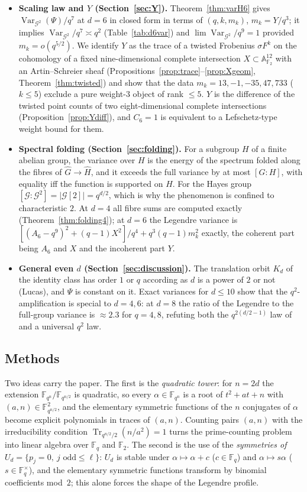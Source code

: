 \documentclass[11pt,a4paper]{amsart}
\theoremstyle{definition}
\newcommand{\F}{\mathbb{F}}
\newcommand{\A}{\mathbb{A}}
\newcommand{\G}{\mathcal{G}}
\newcommand{\Tr}{\operatorname{Tr}}
\newcommand{\Var}{\operatorname{Var}}
\begin{document}
\begin{itemize}[leftmargin=2em]
\item \textbf{Scaling law and $Y$ (Section~\ref{sec:Y}).} Theorem~\ref{thm:varH6} gives $\Var_{\G^2}(\Psi)/q^7$ at $d=6$ in closed form in terms of $(q,k,m_k)$, $m_k=Y/q^3$; it implies $\Var_{\G^2}/q^7\asymp q^2$ (Table~\ref{tab:d6var}) and $\lim\Var_{\G^2}/q^9=1$ provided $m_k=o(q^{5/2})$. We identify $Y$ as the trace of a twisted Frobenius $\sigma F^k$ on the cohomology of a fixed nine-dimensional complete intersection $X\subset\A^{12}_{\F_2}$ with an Artin--Schreier sheaf (Propositions~\ref{prop:trace}--\ref{prop:Xgeom}, Theorem~\ref{thm:twisted}) and show that the data $m_k=13,-1,-35,47,733$ ($k\le5$) exclude a pure weight-$3$ object of rank $\le5$. $Y$ is the difference of the twisted point counts of two eight-dimensional complete intersections (Proposition~\ref{prop:Ydiff}), and $C_6=1$ is equivalent to a Lefschetz-type weight bound for them.
\item \textbf{Spectral folding (Section~\ref{sec:folding}).} For a subgroup $H$ of a finite abelian group, the variance over $H$ is the energy of the spectrum folded along the fibres of $\widehat G\to\widehat H$, and it exceeds the full variance by at most $[G:H]$, with equality iff the function is supported on $H$. For the Hayes group $[\G:\G^2]=|\G[2]|=q^{d/2}$, which is why the phenomenon is confined to characteristic $2$. At $d=4$ all fibre sums are computed exactly (Theorem~\ref{thm:folding4}); at $d=6$ the Legendre variance is $[(A_6-q^9)^2+(q-1)X^2]/q^4+q^3(q-1)m_k^2$ exactly, the coherent part being $A_6$ and $X$ and the incoherent part $Y$.
\item \textbf{General even $d$ (Section~\ref{sec:discussion}).} The translation orbit $K_d$ of the identity class has order $1$ or $q$ according as $d$ is a power of $2$ or not (Lucas), and $\Psi$ is constant on it. Exact variances for $d\le10$ show that the $q^2$-amplification is special to $d=4,6$: at $d=8$ the ratio of the Legendre to the full-group variance is $\approx2.3$ for $q=4,8$, refuting both the $q^{2(d/2-1)}$ law of \cite{Chen} and a universal $q^2$ law.
\end{itemize}

\subsection*{Methods}
Two ideas carry the paper. The first is the \emph{quadratic tower}: for $n=2d$ the extension $\F_{q^n}/\F_{q^{n/2}}$ is quadratic, so every $\alpha\in\F_{q^n}$ is a root of $t^2+at+n$ with $(a,n)\in\F_{q^{n/2}}^2$, and the elementary symmetric functions of the $n$ conjugates of $\alpha$ become explicit polynomials in traces of $(a,n)$. Counting pairs $(a,n)$ with the irreducibility condition $\Tr_{q^{n/2}/2}(n/a^2)=1$ turns the prime-counting problem into linear algebra over $\F_q$ and $\F_2$. The second is the use of the \emph{symmetries of $U_d=\{p_j=0,\ j\text{ odd}\le\ell\}$}: $U_d$ is stable under $\alpha\mapsto\alpha+c$ ($c\in\F_q$) and $\alpha\mapsto s\alpha$ ($s\in\F_q^\times$), and the elementary symmetric functions transform by binomial coefficients mod~$2$; this alone forces the shape of the Legendre profile.
\end{document}
